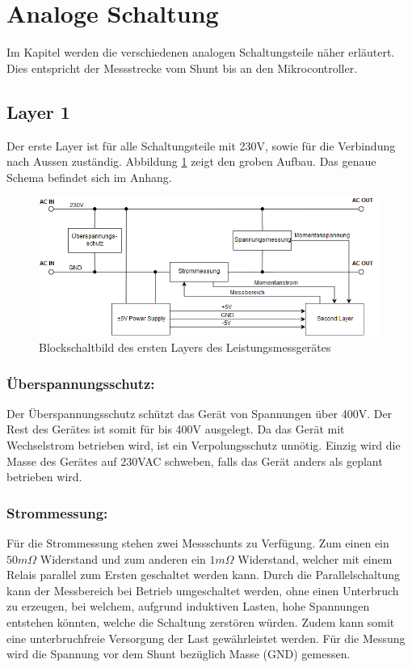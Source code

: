 
\section{Analoge Schaltung}
Im Kapitel werden die verschiedenen analogen Schaltungsteile näher erläutert. Dies entspricht der Messstrecke vom Shunt bis an den Mikrocontroller.
\subsection{Layer 1}%
Der erste Layer ist für alle Schaltungsteile mit 230V, sowie für die Verbindung nach Aussen zuständig. Abbildung \ref{fig:first_layer} zeigt den groben Aufbau. Das genaue Schema befindet sich im Anhang.

\begin{figure}[H]
\begin{center}
\includegraphics[width=160mm]{images/first_layer.png}

	\caption{Blockschaltbild des ersten Layers des Leistungsmessgerätes} %
	\label{fig:first_layer}
\end{center}
\end{figure}

\subsubsection*{Überspannungsschutz:}
Der Überspannungsschutz schützt das Gerät von Spannungen über 400V. Der Rest des Gerätes ist somit für bis 400V ausgelegt. Da das Gerät mit Wechselstrom betrieben wird, ist ein Verpolungsschutz unnötig. Einzig wird die Masse des Gerätes auf 230VAC schweben, falls das Gerät anders als geplant betrieben wird.

\subsubsection*{Strommessung:}
Für die Strommessung stehen zwei Messschunts zu Verfügung. Zum einen ein $50m\Omega$ Widerstand und zum anderen ein $1m\Omega$ Widerstand, welcher mit einem Relais parallel zum Ersten geschaltet werden kann. Durch die Parallelschaltung kann der Messbereich bei Betrieb umgeschaltet werden, ohne einen Unterbruch zu erzeugen, bei welchem, aufgrund induktiven Lasten, hohe Spannungen entstehen könnten, welche die Schaltung zerstören würden. Zudem kann somit eine unterbruchfreie Versorgung der Last gewährleistet werden. Für die Messung wird die Spannung vor dem Shunt bezüglich Masse (GND) gemessen.

